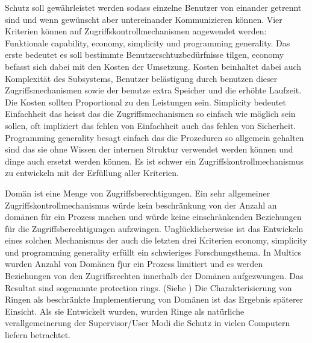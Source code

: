 \documentclass[9pt,technote]{IEEEtran}
\begin{document}
  
    Schutz soll gew\"ahrleistet werden sodass einzelne Benutzer von einander getrennt sind und wenn gew\"unscht aber untereinander Kommunizieren k\"onnen.
    Vier Kriterien k\"onnen auf Zugriffskontrollmechanismen angewendet werden: Funktionale capability, economy, simplicity und programming generality.
    Das erste bedeutet es soll bestimmte Benutzerschtuzbed\"urfnisse tilgen, economy befasst sich dabei mit den Kosten der Umsetzung.
    Kosten beinhaltet dabei auch Komplexit\"at des Subsystems, Benutzer bel\"astigung durch benutzen dieser Zugriffsmechanismen sowie der benutze
    extra Speicher und die erh\"ohte Laufzeit. Die Kosten sollten Proportional zu den Leistungen sein.
    Simplicity bedeutet Einfachheit das heisst das die Zugriffsmechanismen so einfach wie m\"oglich sein sollen, oft
    impliziert das fehlen von Einfachheit auch das fehlen von Sicherheit. Programming generality besagt einfach das die Prozeduren so allgemein gehalten sind
    das sie ohne Wissen der internen Struktur verwendet werden k\"onnen und dinge auch ersetzt werden k\"onnen.
    Es ist schwer ein Zugriffskontrollmechanismus zu entwickeln mit der Erf\"ullung aller Kriterien.
    
    Dom\"an ist eine Menge von Zugriffsberechtigungen. Ein sehr allgemeiner Zugriffskontrollmechanismus w\"urde kein beschr\"ankung von der Anzahl an
    dom\"anen f\"ur ein Prozess machen und w\"urde keine einschr\"ankenden Beziehungen f\"ur die Zugriffsberechtigungen aufzwingen.
    Ungl\"ucklicherweise ist das Entwickeln eines solchen Mechanismus der auch die letzten drei Kriterien economy, simplicity und programming generality
    erf\"ullt ein schwieriges Forschungsthema.  In Multics wurden Anzahl von Dom\"anen f\"jur ein Prozess limitiert und es werden Beziehungen von den Zugriffsrechten innerhalb
    der Dom\"anen aufgezwungen. Das Resultat sind sogenannte protection rings. (Siehe \cite[S. 160]{inproc:protec-rings}) 
    Die Charakterisierung von Ringen als beschr\"ankte Implementierung von Dom\"anen ist das Ergebnis sp\"aterer Einsicht. 
    Als sie Entwickelt wurden, wurden Ringe als nat\"urliche verallgemeinerung der Supervisor/User Modi die Schutz in vielen Computern liefern betrachtet.
    
\end{document}
